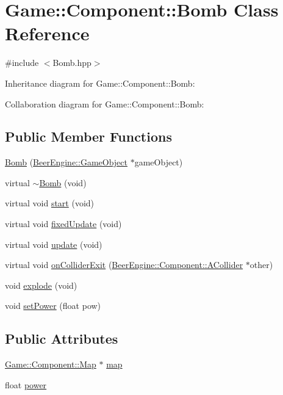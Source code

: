 \hypertarget{class_game_1_1_component_1_1_bomb}{}\section{Game\+:\+:Component\+:\+:Bomb Class Reference}
\label{class_game_1_1_component_1_1_bomb}


{\ttfamily \#include $<$Bomb.\+hpp$>$}



Inheritance diagram for Game\+:\+:Component\+:\+:Bomb\+:


Collaboration diagram for Game\+:\+:Component\+:\+:Bomb\+:
\subsection*{Public Member Functions}
\begin{DoxyCompactItemize}
\item 
\mbox{\hyperlink{class_game_1_1_component_1_1_bomb_aed38ca47ddf849382948b02485be41f8}{Bomb}} (\mbox{\hyperlink{class_beer_engine_1_1_game_object}{Beer\+Engine\+::\+Game\+Object}} $\ast$game\+Object)
\item 
virtual \mbox{\hyperlink{class_game_1_1_component_1_1_bomb_a08d967ddfb90d063b71270ce6d087c2f}{$\sim$\+Bomb}} (void)
\item 
virtual void \mbox{\hyperlink{class_game_1_1_component_1_1_bomb_a74e5f8e628a9d434f0faf91273f33990}{start}} (void)
\item 
virtual void \mbox{\hyperlink{class_game_1_1_component_1_1_bomb_af6598c095c2f36a2a1b1048eb84d6fc7}{fixed\+Update}} (void)
\item 
virtual void \mbox{\hyperlink{class_game_1_1_component_1_1_bomb_a6685384996c92b8d3f0955c2f6a335b5}{update}} (void)
\item 
virtual void \mbox{\hyperlink{class_game_1_1_component_1_1_bomb_a73e1089e8b6be42c0357beda3ab6ccfa}{on\+Collider\+Exit}} (\mbox{\hyperlink{class_beer_engine_1_1_component_1_1_a_collider}{Beer\+Engine\+::\+Component\+::\+A\+Collider}} $\ast$other)
\item 
void \mbox{\hyperlink{class_game_1_1_component_1_1_bomb_aac712a604337a08ce89f88782cae5df9}{explode}} (void)
\item 
void \mbox{\hyperlink{class_game_1_1_component_1_1_bomb_a3432430350d557ef1b7d9ac0339b659a}{set\+Power}} (float pow)
\end{DoxyCompactItemize}
\subsection*{Public Attributes}
\begin{DoxyCompactItemize}
\item 
\mbox{\hyperlink{class_game_1_1_component_1_1_map}{Game\+::\+Component\+::\+Map}} $\ast$ \mbox{\hyperlink{class_game_1_1_component_1_1_bomb_af6be11b39be1333d5bbd64b059bc2b33}{map}}
\item 
float \mbox{\hyperlink{class_game_1_1_component_1_1_bomb_a0e4068ea1fe8146c412c76f472db7087}{power}}
\end{DoxyCompactItemize}
